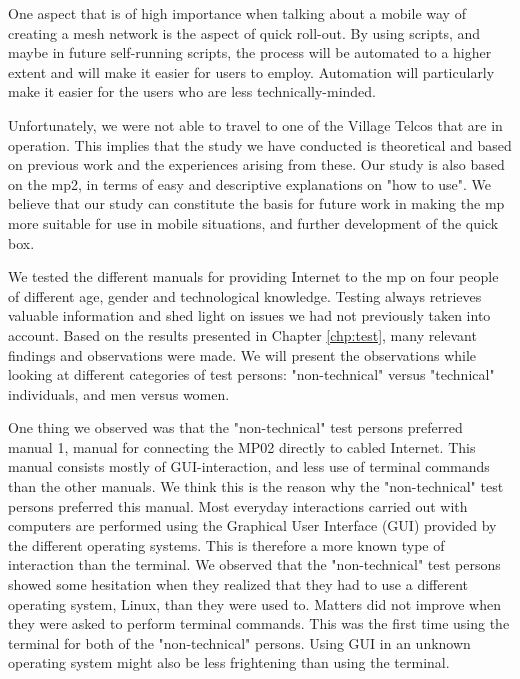 One aspect that is of high importance when talking about a mobile way of creating a mesh network is the aspect of quick roll-out. By using scripts, and maybe in future self-running scripts, the process will be automated to a higher extent and will make it easier for users to employ. Automation will particularly make it easier for the users who are less technically-minded. 

Unfortunately, we were not able to travel to one of the Village Telcos that are in operation. This implies that the study we have conducted is theoretical and based on previous work and the experiences arising from these. Our study is also based on the \gls{mp2}, in terms of easy and descriptive explanations on "how to use". We believe that our study can constitute the basis for future work in making the \gls{mp} more suitable for use in mobile situations, and further development of the \gls{quick} box. 

We tested the different manuals for providing Internet to the \gls{mp} on four people of different age, gender and technological knowledge. Testing always retrieves valuable information and shed light on issues we had not previously taken into account. Based on the results presented in Chapter \ref{chp:test}, many relevant findings and observations were made. We will present the observations while looking at different categories of test persons: "non-technical" versus "technical" individuals, and men versus women. 

One thing we observed was that the "non-technical" test persons preferred manual 1, manual for connecting the MP02 directly to cabled Internet. This manual consists mostly of GUI-interaction, and less use of terminal commands than the other manuals. We think this is the reason why the "non-technical" test persons preferred this manual. Most everyday interactions carried out with computers are performed using the Graphical User Interface (GUI) provided by the different operating systems.  This is therefore a more known type of interaction than the terminal. We observed that the "non-technical" test persons showed some hesitation when they realized that they had to use a different operating system, Linux, than they were used to. Matters did not improve when they were asked to perform terminal commands. This was the first time using the terminal for both of the "non-technical" persons. Using GUI in an unknown operating system might also be less frightening than using the terminal. 


